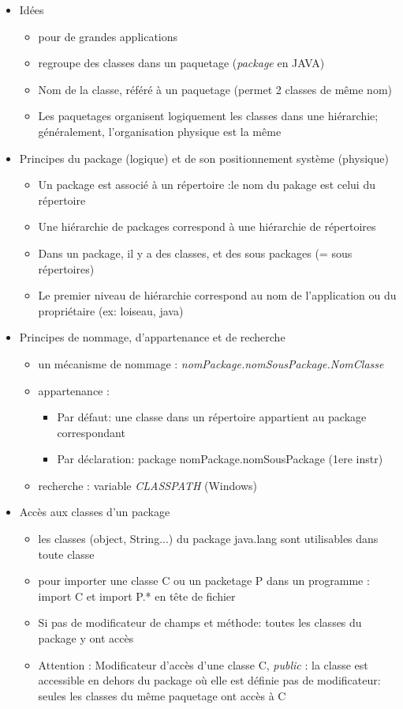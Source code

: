 \documentclass{article}
\begin{document}
\begin{itemize}
	\item Idées
	\begin{itemize}
		\item pour de grandes applications
		\item regroupe des classes dans un paquetage (\emph{package} en JAVA)
		\item Nom de la classe, référé à un paquetage (permet 2 classes de même nom)
		\item  Les paquetages organisent logiquement les classes dans une hiérarchie;
	généralement, l’organisation physique est la même
	\end{itemize}
	\item Principes du package (logique) et de son positionnement système (physique)
	\begin{itemize}
		\item Un package est associé à un répertoire :le nom du pakage est celui du
répertoire
		\item Une hiérarchie de packages correspond à une hiérarchie de répertoires
		\item Dans un package, il y a des classes, et des sous packages (= sous répertoires)
		\item Le premier niveau de hiérarchie correspond au nom de l’application ou du
propriétaire (ex: loiseau, java)
	\end{itemize}
	\item Principes de nommage, d’appartenance et de recherche
	\begin{itemize}
		\item un mécanisme de nommage : \emph{nomPackage.nomSousPackage.NomClasse}
		\item appartenance :
			\begin{itemize}
				\item Par défaut: une classe dans un répertoire appartient au package 
					correspondant
				\item Par déclaration: package nomPackage.nomSousPackage (1ere instr)
			\end{itemize}
		\item recherche : variable \emph{CLASSPATH} (Windows)
	\end{itemize}
	\item Accès aux classes d’un package
	\begin{itemize}
		\item les classes (object, String...) du package java.lang sont utilisables
	dans toute classe
		\item pour importer une classe C ou un packetage P dans un programme :
	import C et  import P.* en tête de fichier
		\item Si pas de modificateur de champs et méthode: toutes les classes du package y
	ont accès
		\item Attention : Modificateur d'accès d'une classe C,  
			\emph{public} : la classe est accessible en dehors du package où elle est définie
		pas de modificateur: seules les classes du même paquetage ont accès à C
	\end{itemize}
\end{itemize} 
\end{document}
